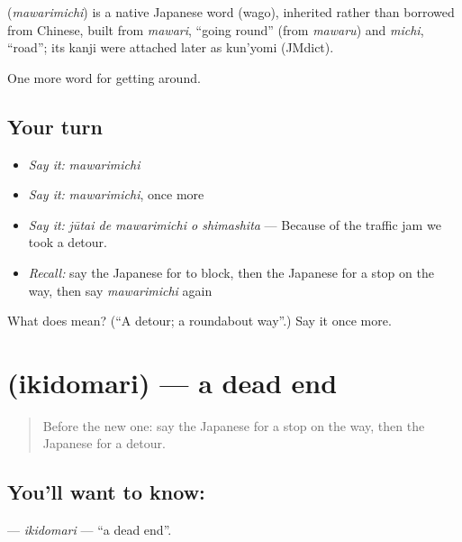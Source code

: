\begin{cousinweb}
\textbf{} (\emph{mawarimichi}) is a native Japanese word (wago), inherited rather than borrowed from Chinese, built from \emph{mawari}, \textquotedblleft{}going round\textquotedblright{} (from \emph{mawaru}) and \emph{michi}, \textquotedblleft{}road\textquotedblright{}; its kanji were attached later as kun'yomi (JMdict).
\end{cousinweb}

\begin{grammarlens}[title={What you've built}]
One more word for getting around.
\end{grammarlens}

\subsection*{Your turn}
\begin{itemize}
\raggedright
  \item \emph{Say it:} \emph{mawarimichi}
  \item \emph{Say it:} \emph{mawarimichi}, once more
  \item \emph{Say it:} \emph{jūtai de mawarimichi o shimashita} — Because of the traffic jam we took a detour.
  \item \emph{Recall:} say the Japanese for to block, then the Japanese for a stop on the way, then say \emph{mawarimichi} again
\end{itemize}

\begin{tcolorbox}[breakable,colback=teal!4,colframe=teal!35!black,title={Before you move on}]
What does  mean? (\textquotedblleft{}A detour; a roundabout way\textquotedblright{}.) Say it once more.
\end{tcolorbox}
\section[\texorpdfstring{\ja{いきどまり} (ikidomari)}{いきどまり (ikidomari)}]{ (ikidomari) — a dead end}

\label{lesson:JA-C392-ikidomari}



\begin{quote}
Before the new one: say the Japanese for a stop on the way, then the Japanese for a detour.
\end{quote}

\subsection*{You'll want to know: }
\textbf{} — \emph{ikidomari} — \textquotedblleft{}a dead end\textquotedblright{}.

